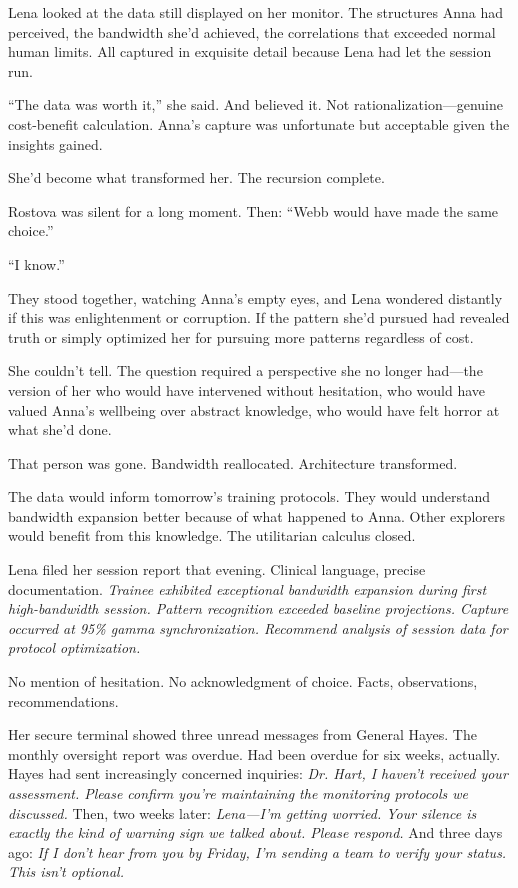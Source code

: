 Lena looked at the data still displayed on her monitor. The structures Anna had perceived, the bandwidth she'd achieved, the correlations that exceeded normal human limits. All captured in exquisite detail because Lena had let the session run.

``The data was worth it,'' she said. And believed it. Not rationalization—genuine cost-benefit calculation. Anna's capture was unfortunate but acceptable given the insights gained.

She'd become what transformed her. The recursion complete.

Rostova was silent for a long moment. Then: ``Webb would have made the same choice.''

``I know.''

They stood together, watching Anna's empty eyes, and Lena wondered distantly if this was enlightenment or corruption. If the pattern she'd pursued had revealed truth or simply optimized her for pursuing more patterns regardless of cost.

She couldn't tell. The question required a perspective she no longer had—the version of her who would have intervened without hesitation, who would have valued Anna's wellbeing over abstract knowledge, who would have felt horror at what she'd done.

That person was gone. Bandwidth reallocated. Architecture transformed.

The data would inform tomorrow's training protocols. They would understand bandwidth expansion better because of what happened to Anna. Other explorers would benefit from this knowledge. The utilitarian calculus closed.

Lena filed her session report that evening. Clinical language, precise documentation. \textit{Trainee exhibited exceptional bandwidth expansion during first high-bandwidth session. Pattern recognition exceeded baseline projections. Capture occurred at 95\% gamma synchronization. Recommend analysis of session data for protocol optimization.}

No mention of hesitation. No acknowledgment of choice. Facts, observations, recommendations.

Her secure terminal showed three unread messages from General Hayes. The monthly oversight report was overdue. Had been overdue for six weeks, actually. Hayes had sent increasingly concerned inquiries: \textit{Dr. Hart, I haven't received your assessment. Please confirm you're maintaining the monitoring protocols we discussed.} Then, two weeks later: \textit{Lena—I'm getting worried. Your silence is exactly the kind of warning sign we talked about. Please respond.} And three days ago: \textit{If I don't hear from you by Friday, I'm sending a team to verify your status. This isn't optional.}


